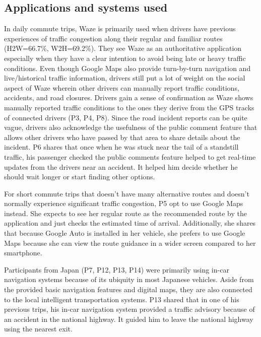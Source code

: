 \subsection{Applications and systems used} 
In daily commute trips, Waze is primarily used when drivers have previous experiences of traffic congestion along their regular and familiar routes (H2W=66.7\%, W2H=69.2\%). They see Waze as an authoritative application especially when they have a clear intention to avoid being late or heavy traffic conditions. Even though Google Maps also provide turn-by-turn navigation and live/historical traffic information, drivers still put a lot of weight on the social aspect of Waze wherein other drivers can manually report traffic conditions, accidents, and road closures. Drivers gain a sense of confirmation as Waze shows manually reported traffic conditions to the ones they derive from the GPS tracks of connected drivers (P3, P4, P8). Since the road incident reports can be quite vague, drivers also acknowledge the usefulness of the public comment feature that allows other drivers who have passed by that area to share details about the incident. P6 shares that once when he was stuck near the tail of a standstill traffic, his passenger checked the public comments feature helped to get real-time updates from the drivers near an accident. It helped him decide whether he should wait longer or start finding other options. 

For short commute trips that doesn't have many alternative routes and doesn't normally experience significant traffic congestion, P5 opt to use Google Maps instead. She expects to see her regular route as the recommended route by the application and just checks the estimated time of arrival. Additionally, she shares that because Google Auto is installed in her vehicle, she prefers to use Google Maps because she can view the route guidance in a wider screen compared to her smartphone. 

Participants from Japan (P7, P12, P13, P14) were primarily using in-car navigation systems because of its ubiquity in most Japanese vehicles. Aside from the provided basic navigation features and digital maps, they are also connected to the local intelligent transportation systems. P13 shared that in one of his previous trips, his in-car navigation system provided a traffic advisory because of an accident in the national highway. It guided him to leave the national highway using the nearest exit.  

